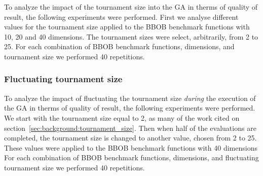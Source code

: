 To analyze the impact of the tournament size into the GA in therms of quality of result, the following experiments were performed. First we analyse different values for the tournament size applied to the BBOB benchmark functions with 10, 20 and 40 dimensions. The tournament sizes were select, arbitrarily, from 2 to 25. For each combination of BBOB benchmark functions, dimensions, and tournament size we performed 40 repetitions.


\subsubsection*{Fluctuating tournament size}

To analyze the impact of fluctuating the tournament size \textit{during} the execution of the GA in therms of quality of result, the following experiments were performed. We start with the tournament size equal to 2, as many of the work cited on section~\ref{sec:background:tournament_size}. Then when half of the evaluations are completed, the tournament size is changed to another value, chosen from 2 to 25. These values were applied to the BBOB benchmark functions with 40 dimensions For each combination of BBOB benchmark functions, dimensions, and fluctuating tournament size we performed 40 repetitions.


